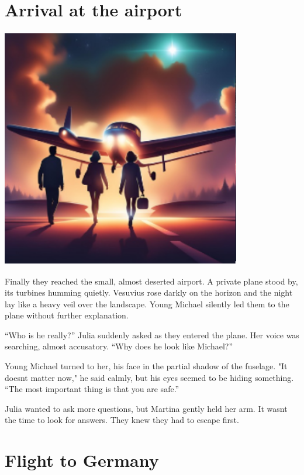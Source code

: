 \documentclass[
]{article}
\begin{document}
\section{Arrival at the airport}\label{arrival-at-the-airport}

\includegraphics[width=4.1232in,height=4.14371in]{media/image7.png}

Finally they reached the small, almost deserted airport. A private plane
stood by, its turbines humming quietly. Vesuvius rose darkly on the
horizon and the night lay like a heavy veil over the landscape. Young
Michael silently led them to the plane without further explanation.

``Who is he really?'' Julia suddenly asked as they entered the plane.
Her voice was searching, almost accusatory. ``Why does he look like
Michael?''

Young Michael turned to her, his face in the partial shadow of the
fuselage. "It doesn\textquotesingle t matter now," he said calmly, but
his eyes seemed to be hiding something. ``The most important thing is
that you are safe.''

Julia wanted to ask more questions, but Martina gently held her arm. It
wasn\textquotesingle t the time to look for answers. They knew they had
to escape first.

\section{Flight to Germany}\label{flight-to-germany}
\end{document}
